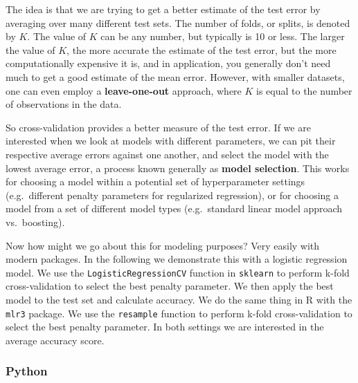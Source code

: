 \documentclass[
  letterpaper,
]{krantz}
\begin{document}
The idea is that we are trying to get a better estimate of the test
error by averaging over many different test sets. The number of folds,
or splits, is denoted by \(K\). The value of \(K\) can be any number,
but typically is 10 or less. The larger the value of \(K\), the more
accurate the estimate of the test error, but the more computationally
expensive it is, and in application, you generally don't need much to
get a good estimate of the mean error. However, with smaller datasets,
one can even employ a \textbf{leave-one-out} approach, where \(K\) is
equal to the number of observations in the data.

So cross-validation provides a better measure of the test error. If we
are interested when we look at models with different parameters, we can
pit their respective average errors against one another, and select the
model with the lowest average error, a process known generally as
\textbf{model selection}. This works for choosing a model within a
potential set of hyperparameter settings (e.g.~different penalty
parameters for regularized regression), or for choosing a model from a
set of different model types (e.g.~standard linear model approach
vs.~boosting).

Now how might we go about this for modeling purposes? Very easily with
modern packages. In the following we demonstrate this with a logistic
regression model. We use the \texttt{LogisticRegressionCV} function in
\texttt{sklearn} to perform k-fold cross-validation to select the best
penalty parameter. We then apply the best model to the test set and
calculate accuracy. We do the same thing in R with the \texttt{mlr3}
package. We use the \texttt{resample} function to perform k-fold
cross-validation to select the best penalty parameter. In both settings
we are interested in the average accuracy score.

\subsubsection{Python}
\end{document}
